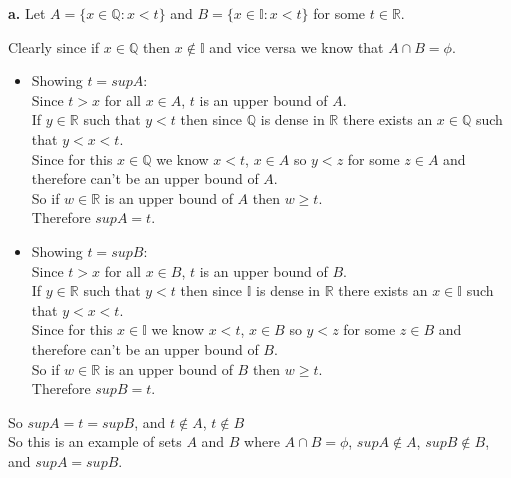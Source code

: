 \documentclass{article}
\begin{document}
{\Large \textbf{a.}} Let $A = \{x\in\mathbb{Q} : x < t\}$ and $B = \{x\in\mathbb{I} : x < t\}$ for some $t\in\mathbb{R}$.
\begin{center}
    \doublespacing
    Clearly since if $x\in\mathbb{Q}$ then $x\notin\mathbb{I}$ and vice versa we know that $A\cap B =\phi$.
    \begin{itemize}
        \item Showing $t = sup A$:
        \\Since $t > x$ for all $x\in A$, $t$ is an upper bound of $A$.
        \\If $y\in\mathbb{R}$ such that $y < t$ then since $\mathbb{Q}$ is dense in $\mathbb{R}$ there exists an $x\in\mathbb{Q}$ such that $y < x < t$.
        \\Since for this $x\in\mathbb{Q}$ we know $x < t$, $x\in A$ so $y < z$ for some $z\in A$ and therefore can't be an upper bound of $A$.
        \\So if $w\in\mathbb{R}$ is an upper bound of $A$ then $w\geq t$.
        \\Therefore $sup A = t$.
        \item Showing $t = sup B$:
        \\Since $t > x$ for all $x\in B$, $t$ is an upper bound of $B$.
        \\If $y\in\mathbb{R}$ such that $y < t$ then since $\mathbb{I}$ is dense in $\mathbb{R}$ there exists an $x\in\mathbb{I}$ such that $y < x < t$.
        \\Since for this $x\in\mathbb{I}$ we know $x < t$, $x\in B$ so $y < z$ for some $z\in B$ and therefore can't be an upper bound of $B$.
        \\So if $w\in\mathbb{R}$ is an upper bound of $B$ then $w\geq t$.
        \\Therefore $sup B = t$.
    \end{itemize}
    So $sup A = t = sup B$, and $t\notin A$, $t\notin B$
    \\So this is an example of sets $A$ and $B$ where $A\cap B = \phi$, $sup A\notin A$, $sup B\notin B$, and $sup A = sup B$.
\end{center}
\end{document}
